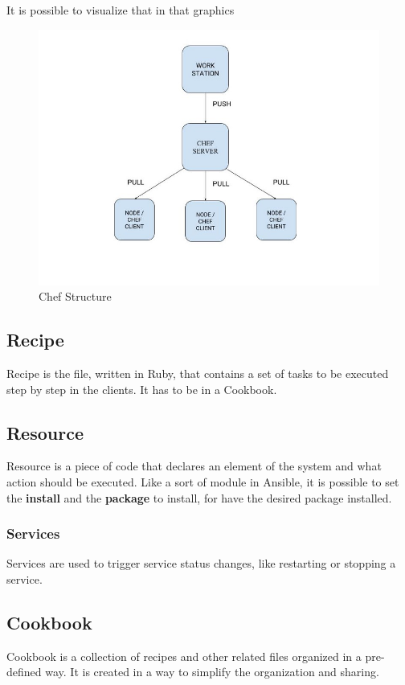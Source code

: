 \documentclass[12pt,a4paper,openright,twoside]{book}
\begin{document}
It is possible to visualize that in that graphics\cite{chefFreeCodeCamp}


\begin{figure}[h]
    \centering
    \includegraphics[width=.8\linewidth]{figures/img_Chef_structure.jpeg}
    \caption{Chef Structure}
    \label{fig:chef-structure-image}
\end{figure}

\subsection{Recipe}
Recipe is the file, written in Ruby, that contains a set of tasks to be executed step by step in the clients. It has to be in a Cookbook.

\subsection{Resource}
Resource is a piece of code that declares an element of the system and what action should be executed.
Like a sort of module in Ansible, it is possible to set the \textbf{install} and the \textbf{package} to install, for have the desired package installed.

\subsubsection{Services}
Services are used to trigger service status changes, like restarting or stopping a service.

\subsection{Cookbook}
Cookbook is a collection of recipes and other related files organized in a pre-defined way. It is created in a way to simplify the organization and sharing.
\end{document}
